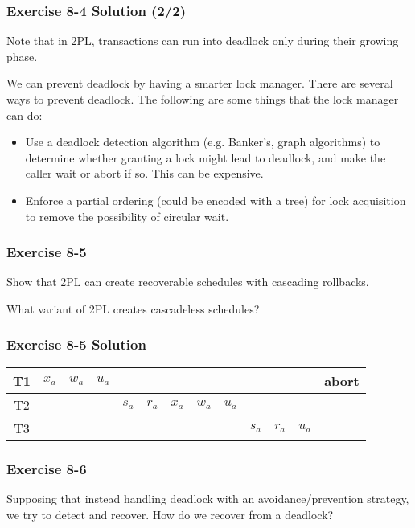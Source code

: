 \begin{frame}
\frametitle{Exercise 8-4 Solution (2/2)}

Note that in 2PL, transactions can run into deadlock only during their growing phase.

We can prevent deadlock by having a smarter lock manager. There are several ways to prevent deadlock. The following are some things that the lock manager can do:

\begin{itemize}
  \item Use a deadlock detection algorithm (e.g. Banker's, graph algorithms) to determine whether granting a lock might lead to deadlock, and make the caller wait or abort if so. This can be expensive.
  \item Enforce a partial ordering (could be encoded with a tree) for lock acquisition to remove the possibility of circular wait.
\end{itemize}

\end{frame}


\begin{frame}
\frametitle{Exercise 8-5}

Show that 2PL can create recoverable schedules with cascading rollbacks.

What variant of 2PL creates cascadeless schedules?

\end{frame}


\begin{frame}
\frametitle{Exercise 8-5 Solution}

\begin{center}
\begin{tabular}{ c c c c c c c c c c c c c }
  \hline
  T1 & $x_a$ & $w_a$ & $u_a$ &      &      &      &      &      &      &      &      & abort \\
  \hline
  T2 &      &      &      & $s_a$ & $r_a$ & $x_a$ & $w_a$ & $u_a$ &      &      &      &      \\
  \hline
  T3 &      &      &      &      &      &      &      &      & $s_a$ & $r_a$ & $u_a$ &      \\
  \hline
\end{tabular}
\end{center}

\end{frame}


\begin{frame}
\frametitle{Exercise 8-6}

Supposing that instead handling deadlock with an avoidance/prevention strategy, we try to detect and recover. How do we recover from a deadlock?

\end{frame}


